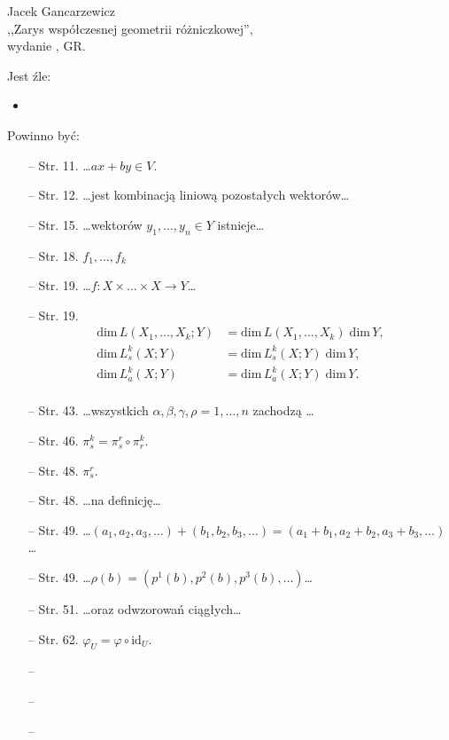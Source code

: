 \documentclass[a4paper,11pt]{article}
\begin{document}
\begin{center}
Jacek Gancarzewicz\\
,,Zarys współczesnej geometrii różniczkowej'',\\ wydanie , GR.
\end{center}
Jest źle:
\begin{itemize}
\item
\end{itemize}
Powinno być:
\begin{itemize}
\item[--] Str. 11. \ldots$ax+by\in V$.
\item[--] Str. 12. \ldots jest kombinacją liniową pozostałych wektorów\ldots
\item[--] Str. 15. \ldots wektorów $y_{1},\ldots,y_{n}\in Y$ istnieje\ldots
\item[--] Str. 18. $f_{1},\ldots,f_{k}$
\item[--] Str. 19. \ldots$f:X\times\ldots\times X \rightarrow Y$\ldots
\item[--] Str. 19.
\begin{align*}
\mathrm{dim}\, L(X_{1},\ldots,X_{k};Y)&=\mathrm{dim}\, L(X_{1},\ldots,X_{k})\; \mathrm{dim}\, Y,\\
\mathrm{dim}\, L^{k}_{s}(X;Y)&=\mathrm{dim}\,L^{k}_{s}(X;Y)\; \mathrm{dim}\, Y,\\
\mathrm{dim}\, L^{k}_{a}(X;Y)&=\mathrm{dim}\,L^{k}_{a}(X;Y)\; \mathrm{dim}\, Y.\\
\end{align*}
\item[--] Str. 43. \ldots wszystkich $\alpha,\beta,\gamma,\rho=1,\ldots,n$ zachodzą \ldots
\item[--] Str. 46. $\pi_{s}^{k}=\pi_{s}^{r}\circ \pi^{k}_{r}$.
\item[--] Str. 48. $\pi^{r}_{s}$.
\item[--] Str. 48. \ldots na def\mbox{}inicję\ldots
\item[--] Str. 49. \ldots$(a_{1},a_{2},a_{3},\ldots)+(b_{1},b_{2},b_{3},\ldots)=(a_{1}+b_{1},a_{2}+b_{2},a_{3}+b_{3},\ldots)$\dots
\item[--] Str. 49. \ldots$\rho(b)=(p^{1}(b),p^{2}(b),p^{3}(b),\ldots)$\dots
\item[--] Str. 51. \ldots oraz odwzorowań ciągłych\ldots
\item[--] Str. 62. $\varphi_{U}=\varphi\circ\mathrm{id}_{U}$.
\item[--]
\item[--]
\item[--]
\end{itemize}
\end{document}
